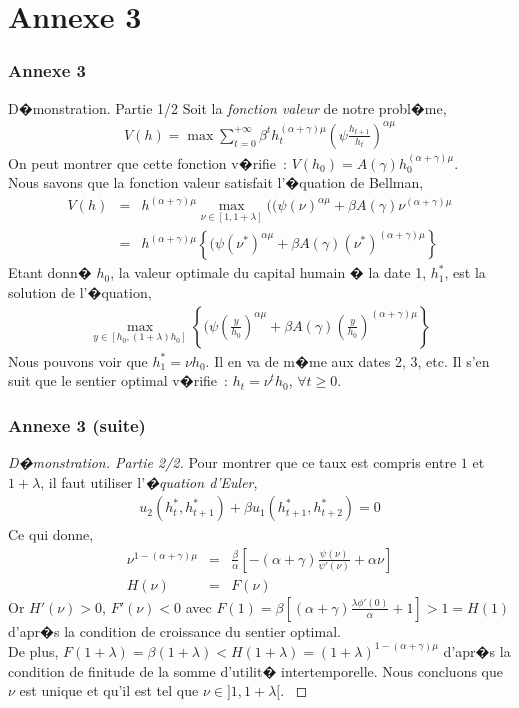 \documentclass[10pt, hyperref={pdfpagemode=FullScreen}]{beamer} %
\begin{document}
\section{Annexe 3}
\begin{frame}\label{annexe3part1}
\frametitle{Annexe 3}
\begin{block}{D�monstration. Partie 1/2}
\scriptsize{
Soit la \alert{\emph{fonction valeur}} de notre probl�me,
\begin{eqnarray*}
V(h) = \max \sum_{t=0}^{+\infty}\beta^{t} h_{t}^{(\alpha+\gamma)\mu}\left(\psi\frac{h_{t+1}}{h_{t}}\right)^{\alpha\mu}
\end{eqnarray*}
On peut montrer que cette fonction v�rifie~: $V(h_{0}) = A(\gamma)h_{0}^{(\alpha+\gamma)\mu}$.\\
Nous savons que la fonction valeur satisfait l'�quation de Bellman,
\begin{eqnarray*}
V(h) &=& h^{(\alpha+\gamma)\mu} \max_{\nu\in[1,1+\lambda]} ((\psi(\nu)^{\alpha\mu}+\beta A(\gamma)\nu^{(\alpha+\gamma)\mu} \\
    &=& h^{(\alpha+\gamma)\mu} \left\{(\psi(\nu^{*})^{\alpha\mu}+\beta A(\gamma)(\nu^{*})^{(\alpha+\gamma)\mu}\right\}
\end{eqnarray*}
Etant donn� $h_{0}$, la valeur optimale du capital humain � la date 1, $h_{1}^{*}$, est la solution de l'�quation, 
\begin{eqnarray*}
\max_{y\in[h_{0},(1+\lambda)h_{0}]} \left\{(\psi(\frac{y}{h_{0}})^{\alpha\mu}+\beta A(\gamma)(\frac{y}{h_{0}})^{(\alpha+\gamma)\mu}\right\}
\end{eqnarray*}
Nous pouvons voir que $h_{1}^{*}=\nu h_{0}$. Il en va de m�me aux dates 2, 3, etc. Il s'en suit que le sentier optimal v�rifie~: $h_{t}=\nu^{t}h_{0}$, $\forall t\geq 0$.
}
\end{block}
\end{frame}


\begin{frame}\label{annexe3part2}
\frametitle{Annexe 3 (suite)}
\begin{proof}[D�monstration. Partie 2/2]
\scriptsize{
Pour montrer que ce taux est compris entre $1$ et $1+\lambda$, il faut utiliser l'\emph{�quation d'Euler},
\begin{eqnarray*}
u_{2}(h_{t}^{*},h_{t+1}^{*}) + \beta u_{1}(h_{t+1}^{*},h_{t+2}^{*}) = 0
\end{eqnarray*}
Ce qui donne,
\begin{eqnarray*}
\nu^{1-(\alpha+\gamma)\mu} &=& \frac{\beta}{\alpha}\left[-(\alpha+\gamma)\frac{\psi(\nu)}{\psi'(\nu)}+\alpha\nu\right] \\
H(\nu)                     &=& F(\nu) 
\end{eqnarray*}
Or $H'(\nu)>0$, $F'(\nu)<0$ avec $F(1)=\beta[(\alpha+\gamma)\frac{\lambda\phi'(0)}{\alpha}+1]>1=H(1)$ d'apr�s la condition de croissance du sentier optimal. \\
De plus, $F(1+\lambda)=\beta(1+\lambda)<H(1+\lambda)=(1+\lambda)^{1-(\alpha+\gamma)\mu}$ d'apr�s la condition de finitude de la somme d'utilit� intertemporelle. Nous concluons que $\nu$ est unique et qu'il est tel que $\nu\in]1,1+\lambda[$. 
}
\end{proof}
\end{frame}
\end{document}
